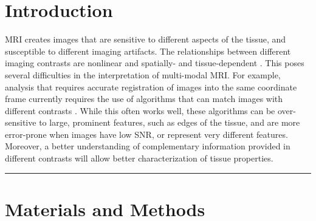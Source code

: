 \documentclass[a0, landscape]{a0poster}
\begin{document}
\begin{multicols}{3} %


\section*{Introduction}

MRI creates images that are sensitive to different aspects of the tissue, and
susceptible to different imaging artifacts. The relationships between different
imaging contrasts are nonlinear and spatially- and tissue-dependent
\cite{Vymazal1995-zo}. This poses several difficulties in the interpretation of
multi-modal MRI. For example, analysis that requires accurate registration of
images into the same coordinate frame currently requires the use of algorithms
that can match images with different contrasts \cite{Klein2009-gq}. While this
often works well, these algorithms can be over-sensitive to large, prominent
features, such as edges of the tissue, and are more error-prone when images
have low SNR, or represent very different features. Moreover, a better
understanding of complementary information provided in different contrasts will
allow better characterization of tissue properties.

\rule{\linewidth}{0.4pt}

\normalsize
\section*{Materials and Methods}


\end{multicols}
\end{document}
